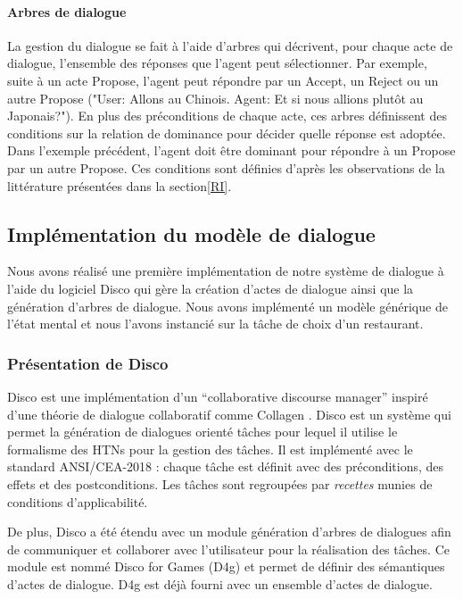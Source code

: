 \documentclass [french]{sig-alternate-05-2015}
\begin{document}
\paragraph{Arbres de dialogue}
La gestion du dialogue se fait à l'aide d'arbres qui décrivent, pour chaque acte de dialogue, l'ensemble des réponses que l'agent peut sélectionner. Par exemple, suite à un acte Propose, l'agent peut répondre par un Accept, un Reject ou un autre Propose ("User: Allons au Chinois. Agent: Et si nous allions plutôt au Japonais?"). En plus des préconditions de chaque acte, ces arbres définissent des conditions sur la relation de dominance pour décider quelle réponse est adoptée. Dans l'exemple précédent, l'agent doit être dominant pour répondre à un Propose par un autre Propose. Ces conditions sont définies d'après les observations de la littérature présentées dans la section\ref{RI}.


\subsection{Implémentation du modèle de dialogue}

\par Nous avons réalisé une première implémentation de notre système de dialogue à l'aide du logiciel Disco \cite{rich2009building} qui gère la création d'actes de dialogue ainsi que la génération d'arbres de dialogue. Nous avons implémenté un modèle générique de l'état mental et nous l'avons instancié sur la tâche de choix d'un restaurant.

\subsubsection{Présentation de Disco}
Disco est une implémentation d'un ``collaborative discourse manager'' inspiré d'une théorie de dialogue collaboratif comme Collagen \cite{rich1997collagen}. Disco est un système qui permet la génération de dialogues orienté tâches pour lequel il utilise le formalisme des HTNs \cite{erol1996hierarchical} pour la gestion des tâches. Il est implémenté avec le standard ANSI/CEA-2018 : chaque tâche est définit avec des préconditions, des effets et des postconditions. Les tâches sont regroupées par \emph{recettes} munies de conditions d'applicabilité.

De plus, Disco a été étendu avec un module génération d'arbres de dialogues afin de communiquer et collaborer avec l'utilisateur pour la réalisation des tâches. Ce module est nommé Disco for Games (D4g) et permet de définir des sémantiques d'actes de dialogue. D4g est déjà fourni avec un ensemble d'actes de dialogue.
\end{document}

